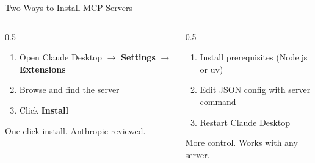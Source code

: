 \documentclass[aspectratio=169]{beamer}
\begin{document}
\begin{frame}{Two Ways to Install MCP Servers}
\begin{columns}[T]
\begin{column}{0.5\textwidth}
\begin{shadedbox}[title=\textbf{Desktop Extensions (Easy)}]
\begin{enumerate}\small
  \item Open Claude Desktop $\rightarrow$ \textbf{Settings} $\rightarrow$ \textbf{Extensions}
  \item Browse and find the server
  \item Click \textbf{Install}
\end{enumerate}
\vspace{0.2cm}
One-click install. Anthropic-reviewed.
\end{shadedbox}
\end{column}
\begin{column}{0.5\textwidth}
\begin{shadedbox}[title=\textbf{Manual Configuration}]
\begin{enumerate}\small
  \item Install prerequisites (Node.js or uv)
  \item Edit JSON config with server command
  \item Restart Claude Desktop
\end{enumerate}
\vspace{0.2cm}
More control. Works with any server.
\end{shadedbox}
\end{column}
\end{columns}
\end{frame}
\end{document}
